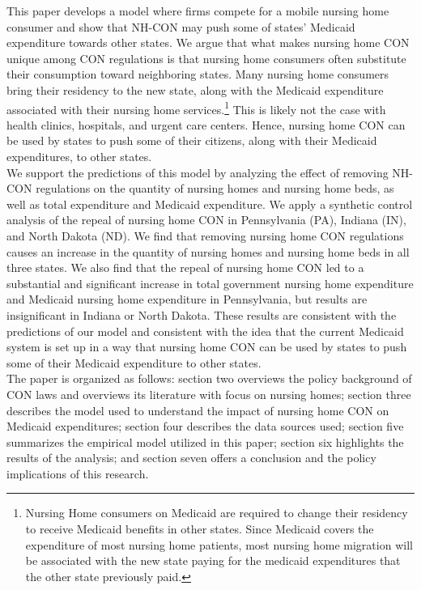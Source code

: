 \documentclass[../Main.tex]{subfiles}
\begin{document}
\indent This paper develops a model where firms compete for a mobile nursing home consumer and show that NH-CON may push some of states’ Medicaid expenditure towards other states.  We argue that what makes nursing home CON unique among CON regulations is that nursing home consumers often substitute their consumption toward neighboring states. Many nursing home consumers bring their residency to the new state, along with the Medicaid expenditure associated with their nursing home services.\footnote{Nursing Home consumers on Medicaid are required to change their residency to receive Medicaid benefits in other states. Since Medicaid covers the expenditure of most nursing home patients, most nursing home migration will be associated with the new state paying for the medicaid expenditures that the other state previously paid.} This is likely not the case with health clinics, hospitals, and urgent care centers. Hence, nursing home CON can be used by states to  push some of their citizens, along with their Medicaid expenditures, to other states.\\
\indent We support the predictions of this model by analyzing the effect of removing NH-CON regulations on the quantity of nursing homes and nursing home beds, as well as total expenditure and Medicaid expenditure. We apply a synthetic control analysis of the repeal of nursing home CON in Pennsylvania (PA), Indiana (IN), and North Dakota (ND). We find that removing nursing home CON regulations causes an increase in the quantity of nursing homes and nursing home beds in all three states. We also find that the repeal of nursing home CON led to a substantial and significant increase in total government nursing home expenditure and Medicaid nursing home expenditure in Pennsylvania, but results are insignificant in Indiana or North Dakota. These results are consistent with the predictions of our model and consistent with the idea that the current Medicaid system is set up in a way that nursing home CON can be used by states to push some of their Medicaid expenditure to other states. \\
\indent The paper is organized as follows: section two overviews the policy background of CON laws and overviews its literature with focus on nursing homes; section three describes the model used to understand the impact of nursing home CON on Medicaid expenditures; section four describes the data sources used; section five summarizes the empirical model utilized in this paper; section six highlights the results of the analysis; and section seven offers a conclusion and the policy implications of this research.
\end{document}
